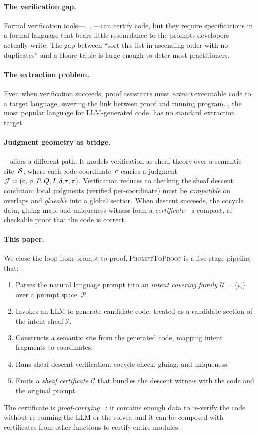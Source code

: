 \documentclass[11pt]{article}
\newcommand{\PromptToProof}{\textsc{PromptToProof}}
\newcommand{\IntentSheaf}{\mathcal{I}}
\newcommand{\ProofCert}{\mathcal{C}}
\newcommand{\PromptSpace}{\mathcal{P}}
\newcommand{\IntentFrag}{\iota}
\newcommand{\CoverFam}{\mathcal{U}}
\begin{document}
\paragraph{The verification gap.}
Formal verification tools---\Dafny{}, \Fstar{}, \LEAN{}---can certify
code, but they require specifications in a formal language that bears
little resemblance to the prompts developers actually write.  The gap
between ``sort this list in ascending order with no duplicates'' and a
Hoare triple is large enough to deter most practitioners.

\paragraph{The extraction problem.}
Even when verification succeeds, proof assistants must \emph{extract}
executable code to a target language, severing the link between proof
and running program.  \Python{}, the most popular language for
LLM-generated code, has no standard extraction target.

\paragraph{Judgment geometry as bridge.}
\JuGeo{}~\cite{Young2025seminal} offers a different path.  It models
verification as sheaf theory over a semantic site~$\mathcal{S}$, where each
code coordinate~$\mathsf{c}$ carries a judgment
$\mathcal{J} = (\mathsf{c}, \varphi, P, Q, I, \delta, \tau, \pi)$.  Verification
reduces to checking the sheaf descent condition: local judgments
(verified per-coordinate) must be \emph{compatible} on overlaps and
\emph{glueable} into a global section.  When descent succeeds, the
cocycle data, gluing map, and uniqueness witness form a
\emph{certificate}---a compact, re-checkable proof that the code is
correct.

\paragraph{This paper.}
We close the loop from prompt to proof.  \PromptToProof{} is a
five-stage pipeline that:
\begin{enumerate}[noitemsep]
  \item Parses the natural language prompt into an \emph{intent
    covering family} $\CoverFam = \{\IntentFrag_i\}$ over a prompt
    space~$\PromptSpace$.
  \item Invokes an LLM to generate candidate code, treated as a
    candidate section of the intent sheaf $\IntentSheaf$.
  \item Constructs a \JuGeo{} semantic site from the generated code,
    mapping intent fragments to coordinates.
  \item Runs sheaf descent verification: cocycle check, gluing, and
    uniqueness.
  \item Emits a \emph{sheaf certificate} $\ProofCert$ that bundles
    the descent witness with the code and the original prompt.
\end{enumerate}
The certificate is \emph{proof-carrying \Python{}}~\cite{Young2025pcp}:
it contains enough data to re-verify the code without re-running the
LLM or the solver, and it can be composed with certificates from other
functions to certify entire modules.
\end{document}
